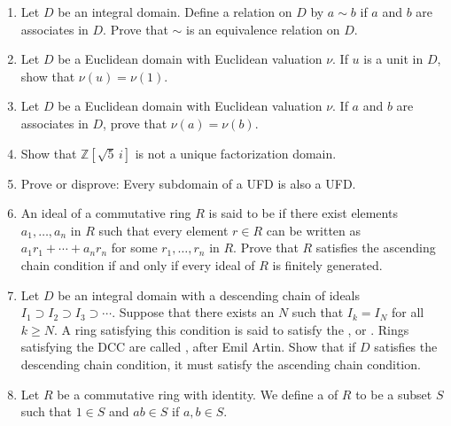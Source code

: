 {\begin{enumerate}
\item
Let $D$ be an integral domain. Define a relation on $D$ by $a \sim b$
if $a$ and $b$ are associates in $D$.  Prove that $\sim$ is an
equivalence relation on $D$.  


\item
Let $D$ be a Euclidean domain with Euclidean valuation $\nu$.  If $u$
is a unit in $D$, show that $\nu(u) = \nu(1)$.


\item
Let $D$ be a Euclidean domain with Euclidean valuation $\nu$.  If $a$
and $b$ are associates in $D$, prove that $\nu(a) = \nu(b)$.


\item
Show that ${\mathbb Z}[\sqrt{5}\, i]$ is not a unique factorization domain.



\item
Prove or disprove:  Every subdomain of a UFD is also a UFD.


\item
An ideal of a commutative ring $R$ is said to be  if there exist elements
$a_1, \ldots, a_n$ in $R$ such that every element $r \in R$ can be
written as $a_1 r_1 + \cdots + a_n r_n$ for some $r_1, \ldots, r_n$ in
$R$.  Prove that $R$ satisfies the ascending chain condition if and
only if every ideal of $R$ is finitely generated.  


\item
Let $D$ be an integral domain with a descending chain of ideals $I_1
\supset I_2 \supset I_3 \supset \cdots$.  Suppose that there exists an $N$ such that
$I_k = I_N$ for all $k \geq N$. A ring satisfying this condition is
said to satisfy the , or . Rings satisfying the DCC are called
, after Emil
Artin.  Show that if $D$ satisfies the descending chain condition, it must satisfy the ascending chain condition.


\item
Let $R$ be a commutative ring with identity. We define a  of $R$ to be a
subset $S$ such that $1 \in S$ and $ab \in S$ if $a, b \in S$. 
\begin{enumerate}


\end{enumerate}
\end{enumerate}}

